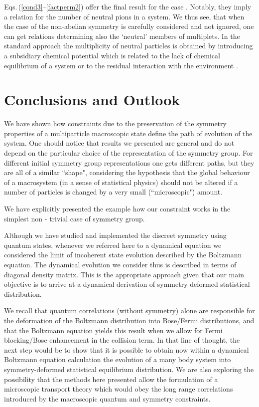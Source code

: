 \documentclass[a4paper,11pt]{article}
\begin{document}
Eqs.\,(\ref{cond3}--\ref{factperm2}) offer the final result for
the \coordHE{} case . Notably, they imply a  relation for the number
of neutral pions in a system. We thus see, that when the case of
the non-abelian symmetry is carefully considered and not ignored,
one can get relations determining also the `neutral' members of
multiplets. In the standard approach the multiplicity of neutral
particles is obtained by introducing a subsidiary chemical
potential which is related to the lack of chemical equilibrium of
a system \cite{Kataja} or to the residual interaction with the
environment \cite{Turko2}.

\section{\normalsize\bf Conclusions and Outlook}\label{conc}
\noindent
 We have shown how constraints due to the preservation of the
symmetry properties of a multiparticle macroscopic state define
the path of evolution of the system. One should notice that
results we presented are general and do not depend on the
particular choice of the representation of the symmetry group. For
different initial symmetry group representations one gets
different paths, but they are all of a similar ``shape",
considering the hypothesis that the global behaviour of a
macrosystem (in a sense of statistical physics) should not be
altered  if a number of particles is changed by a very small
(``microscopic") amount.

We have explicitly presented the example how our constraint works
in the simplest non - trivial case of \coordHE{} symmetry group.

Although we have studied and implemented the discreet symmetry
using quantum states, whenever we referred here to a dynamical
equation we considered the limit of incoherent state evolution
described by the Boltzmann equation. The dynamical evolution we
consider thus is described in terms of diagonal density matrix.
This is the appropriate approach given that our main objective is
to arrive at a dynamical derivation of symmetry deformed
statistical distribution.

We recall  that quantum correlations (without symmetry) alone are
responsible for the deformation of the Boltzmann distribution into
Bose/Fermi distributions, and that the Boltzmann equation yields
this result when we allow for Fermi blocking/Bose enhancement in
the collision term. In that line of thought, the next step would
be to show that it is possible to obtain now within a dynamical
Boltzmann equation calculation the evolution of a many body system
into symmetry-deformed statistical equilibrium distribution. We
are also exploring the possibility that the methods here presented
allow the formulation of a microscopic transport theory which
would obey the long range correlations introduced by the
macroscopic quantum and symmetry constraints.
\end{document}
